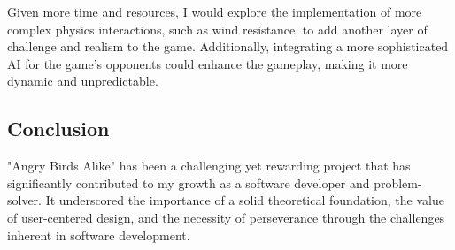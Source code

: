 \documentclass[12pt]{article}
\begin{document}
Given more time and resources, I would explore the implementation of more complex physics interactions, such as wind resistance, to add another layer of challenge and realism to the game. Additionally, integrating a more sophisticated AI for the game's opponents could enhance the gameplay, making it more dynamic and unpredictable.

\subsection{Conclusion}

"Angry Birds Alike" has been a challenging yet rewarding project that has significantly contributed to my growth as a software developer and problem-solver. It underscored the importance of a solid theoretical foundation, the value of user-centered design, and the necessity of perseverance through the challenges inherent in software development.
\end{document}
